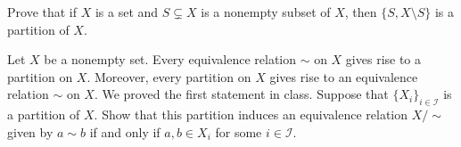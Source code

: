 \documentclass[11pt,letterpaper]{article}
\begin{document}
\newpage





 Prove that if $X$ is a set and $S \subsetneq X$ is a nonempty subset of $X$, then $\{ S, X \setminus S \}$ is a partition of $X$.  \pspace





\newpage





 Let $X$ be a nonempty set. Every equivalence relation $\sim$ on $X$ gives rise to a partition on $X$. Moreover, every partition on $X$ gives rise to an equivalence relation $\sim$ on $X$. We proved the first statement in class. Suppose that $\{ X_i \}_{i \in \mathcal{I}}$ is a partition of $X$. Show that this partition induces an equivalence relation $X/\sim$ given by $a \sim b$ if and only if $a, b \in X_i$ for some $i \in \mathcal{I}$. \pspace
\end{document}
